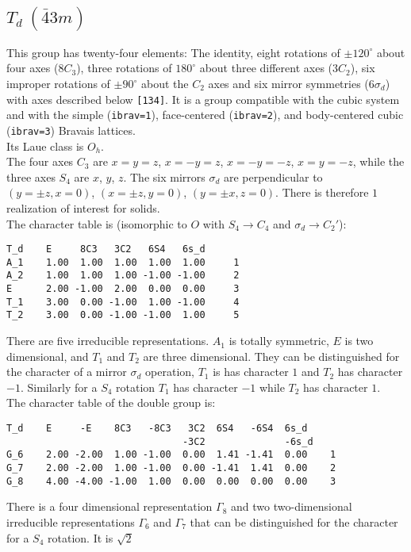 \documentclass[12pt,a4paper]{article}
\begin{document}
\subsection{\color{web-blue}$T_d\ (\bar 43m)$}
This group has twenty-four elements: The identity, eight rotations 
of $\pm120^\circ$ about four axes ($8C_3$), three rotations of 
$180^\circ$ about three different axes ($3C_2$), six
improper rotations of $\pm90^\circ$ about the $C_2$ axes and
six mirror symmetries ($6\sigma_d$) with axes described below \texttt{[134]}.
It is a group compatible with the cubic system and with the  
simple (\texttt{ibrav=1}), face-centered (\texttt{ibrav=2}), 
and body-centered cubic (\texttt{ibrav=3}) Bravais lattices. \\
Its Laue class is $O_{h}$. \\
The four axes $C_3$ are $x=y=z$, $x=-y=z$, $x=-y=-z$, $x=y=-z$, while
the three axes $S_4$ are $x$, $y$, $z$. 
The six mirrors $\sigma_d$ are perpendicular to $(y=\pm z, x=0)$,
$(x=\pm z, y=0)$, $(y=\pm x, z=0)$.
There is therefore $1$ realization of interest for solids. \\
The character table is (isomorphic to $O$ with $S_4 \rightarrow C_4$ and
$\sigma_d \rightarrow C_2'$):
\begin{verbatim}
T_d    E     8C3   3C2   6S4   6s_d
A_1    1.00  1.00  1.00  1.00  1.00     1
A_2    1.00  1.00  1.00 -1.00 -1.00     2
E      2.00 -1.00  2.00  0.00  0.00     3
T_1    3.00  0.00 -1.00  1.00 -1.00     4
T_2    3.00  0.00 -1.00 -1.00  1.00     5
\end{verbatim}
There are five irreducible representations. $A_1$ is totally symmetric,
$E$ is two dimensional, and $T_1$ and $T_2$ are three dimensional.
They can be distinguished for the character of a mirror $\sigma_d$ operation,
$T_1$ is has character $1$ and $T_2$ has character $-1$. 
Similarly for a $S_4$ rotation $T_1$ has character $-1$ 
while $T_2$ has character $1$. \\
The character table of the double group is:
\begin{verbatim}
T_d    E     -E    8C3   -8C3   3C2  6S4   -6S4  6s_d 
                               -3C2              -6s_d
G_6    2.00 -2.00  1.00 -1.00  0.00  1.41 -1.41  0.00    1
G_7    2.00 -2.00  1.00 -1.00  0.00 -1.41  1.41  0.00    2
G_8    4.00 -4.00 -1.00  1.00  0.00  0.00  0.00  0.00    3
\end{verbatim}
There is a four dimensional representation $\Gamma_8$ and two two-dimensional 
irreducible representations $\Gamma_6$ and $\Gamma_7$ that can be
distinguished for the character for a $S_4$ rotation. It is $\sqrt{2}$
\end{document}
